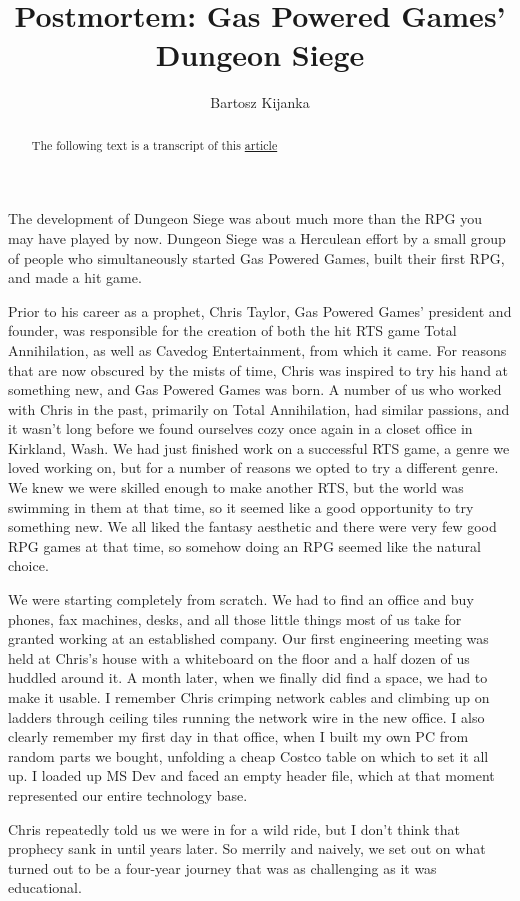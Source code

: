 \documentclass[a4paper,10pt]{article}
\title{Postmortem: Gas Powered Games' Dungeon Siege}
\author{Bartosz Kijanka}
\begin{document}
\maketitle

\begin{abstract}

    The following text is a transcript of this \href{https://www.gamasutra.com/view/feature/131321/postmortem_gas_powered_games_.php}{article}

\end{abstract}

The development of Dungeon Siege was about much more than the RPG you may have played by now. Dungeon Siege was a Herculean effort by a small group of people who simultaneously started Gas Powered Games, built their first RPG, and made a hit game.

Prior to his career as a prophet, Chris Taylor, Gas Powered Games' president and founder, was responsible for the creation of both the hit RTS game Total Annihilation, as well as Cavedog Entertainment, from which it came. For reasons that are now obscured by the mists of time, Chris was inspired to try his hand at something new, and Gas Powered Games was born. A number of us who worked with Chris in the past, primarily on Total Annihilation, had similar passions, and it wasn't long before we found ourselves cozy once again in a closet office in Kirkland, Wash. We had just finished work on a successful RTS game, a genre we loved working on, but for a number of reasons we opted to try a different genre. We knew we were skilled enough to make another RTS, but the world was swimming in them at that time, so it seemed like a good opportunity to try something new. We all liked the fantasy aesthetic and there were very few good RPG games at that time, so somehow doing an RPG seemed like the natural choice.

We were starting completely from scratch. We had to find an office and buy phones, fax machines, desks, and all those little things most of us take for granted working at an established company. Our first engineering meeting was held at Chris's house with a whiteboard on the floor and a half dozen of us huddled around it. A month later, when we finally did find a space, we had to make it usable. I remember Chris crimping network cables and climbing up on ladders through ceiling tiles running the network wire in the new office. I also clearly remember my first day in that office, when I built my own PC from random parts we bought, unfolding a cheap Costco table on which to set it all up. I loaded up MS Dev and faced an empty header file, which at that moment represented our entire technology base.

Chris repeatedly told us we were in for a wild ride, but I don't think that prophecy sank in until years later. So merrily and naively, we set out on what turned out to be a four-year journey that was as challenging as it was educational.
\end{document}
